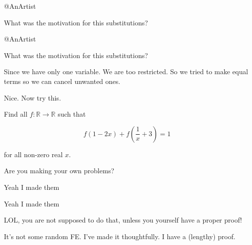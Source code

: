 \begin{solution}
	@AnArtist

What was the motivation for this substitutions?
\end{solution}



\begin{solution}
	\begin{tcolorbox}@AnArtist

What was the motivation for this substitutions?\end{tcolorbox}

Since we have only one variable. We are too restricted. So we tried to make equal terms so we can cancel unwanted ones.
\end{solution}



\begin{solution}
	\begin{tcolorbox}Nice. Now try this.

Find all $f: \mathbb{R}\to\mathbb{R}$ such that

$$f \left( 1-2x \right) + f \left( \frac{1}{x} + 3 \right) = 1$$

for all non-zero real $x$.\end{tcolorbox}

Are you making your own problems? 
\end{solution}



\begin{solution}
	Yeah I made them
\end{solution}



\begin{solution}
	\begin{tcolorbox}Yeah I made them\end{tcolorbox}

LOL, you are not supposed to do that, unless you yourself have a proper proof!
\end{solution}



\begin{solution}
	It's not some random FE. I've made it thoughtfully. I have a (lengthy) proof.
\end{solution}



